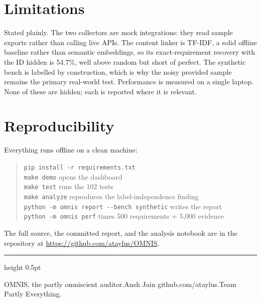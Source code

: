 \documentclass[11pt]{article}
\newcommand{\authorname}{Ansh Jain}
\newcommand{\authorhandle}{github.com/ataylus}
\newcommand{\watermark}{\authorname\,\textbar\,\authorhandle}
\newcommand{\code}[1]{\texttt{\small #1}}
\begin{document}
\section{Limitations}

Stated plainly. The two collectors are mock integrations: they read sample exports rather
than calling live APIs. The content linker is TF-IDF, a solid offline baseline rather than
semantic embeddings, so its exact-requirement recovery with the ID hidden is 54.7\%, well
above random but short of perfect. The synthetic bench is labelled by construction, which
is why the noisy provided sample remains the primary real-world test. Performance is
measured on a single laptop. None of these are hidden; each is reported where it is
relevant.

\section{Reproducibility}

Everything runs offline on a clean machine:

\begin{quote}
\code{pip install -r requirements.txt}\\
\code{make demo} \quad opens the dashboard\\
\code{make test} \quad runs the 102 tests\\
\code{make analyze} \quad reproduces the label-independence finding\\
\code{python -m omnis report -{}-bench synthetic} \quad writes the report\\
\code{python -m omnis perf} \quad times 500 requirements + 5,000 evidence
\end{quote}

The full source, the committed report, and the analysis notebook are in the repository at
\url{https://github.com/ataylus/OMNIS}.

\vspace{1.4em}
{\color{line}\hrule height 0.5pt}
\vspace{0.5em}
\begin{center}
\sffamily\footnotesize\color{muted}
OMNIS, the partly omniscient auditor.\quad \watermark.\quad Team Partly Everything.
\end{center}
\end{document}

